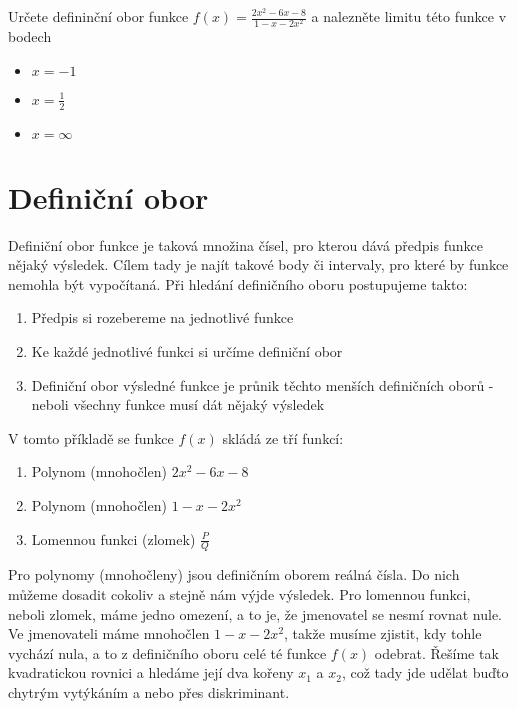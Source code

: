 \documentclass[]{article}
\begin{document}
	
	Určete defininční obor funkce $f(x) = \frac{2x^2-6x-8}{1-x-2x^2}$ a nalezněte limitu této funkce v bodech
	\begin{itemize}
		\item $x = -1$
		\item $x = \frac{1}{2}$
		\item $x = \infty$
	\end{itemize}
			
	\section{Definiční obor}
	Definiční obor funkce je taková množina čísel, pro kterou dává předpis funkce nějaký výsledek. Cílem tady je najít takové body či intervaly, pro které by funkce nemohla být vypočítaná. Při hledání definičního oboru postupujeme takto:
	\begin{enumerate}
		\item Předpis si rozebereme na jednotlivé funkce
		\item Ke každé jednotlivé funkci si určíme definiční obor
		\item Definiční obor výsledné funkce je průnik těchto menších definičních oborů - neboli všechny funkce musí dát nějaký výsledek
	\end{enumerate}
	
	V tomto příkladě se funkce $f(x)$ skládá ze tří funkcí:
	\begin{enumerate}
		\item Polynom (mnohočlen) $2x^2-6x-8$
		\item Polynom (mnohočlen) $1-x-2x^2$
		\item Lomennou funkci (zlomek) $\frac{P}{Q}$
	\end{enumerate}
	
	Pro polynomy (mnohočleny) jsou definičním oborem reálná čísla. Do nich můžeme dosadit cokoliv a stejně nám výjde výsledek. Pro lomennou funkci, neboli zlomek, máme jedno omezení, a to je, že jmenovatel se nesmí rovnat nule. Ve jmenovateli máme mnohočlen $1-x-2x^2$, takže musíme zjistit, kdy tohle vychází nula, a to z definičního oboru celé té funkce $f(x)$ odebrat. Řešíme tak kvadratickou rovnici a hledáme její dva kořeny $x_1$ a $x_2$, což tady jde udělat buďto chytrým vytýkáním a nebo přes diskriminant.
	
\end{document}
